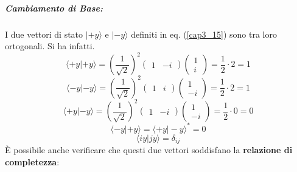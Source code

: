 \subparagraph{Cambiamento di Base:}
I due vettori di stato $| +y \rangle $ e $| -y \rangle$ definiti in eq. (\ref{cap3_15}) sono tra loro ortogonali. Si ha infatti.
	\begin{equation}
		\langle +y | +y \rangle=\left(\frac{1}{\sqrt{2}}\right)^2
		\begin{pmatrix}
		1 & -i
		\end{pmatrix}
		\begin{pmatrix}
		1 \\
		i
		\end{pmatrix}=
		\frac{1}{2}\cdot 2= 1
	\end{equation}
	\begin{equation}
		\langle -y | -y \rangle =\left(\frac{1}{\sqrt{2}}\right)^2
		\begin{pmatrix}
		1 & i
		\end{pmatrix}
		\begin{pmatrix}
1 \\
-i
\end{pmatrix}=
		\frac{1}{2}\cdot 2= 1
	\end{equation}
		\begin{equation}
		\langle +y | -y \rangle =\left(\frac{1}{\sqrt{2}}\right)^2
		\begin{pmatrix}
		1 & -i
		\end{pmatrix}
		\begin{pmatrix}
		1 \\
		-i
		\end{pmatrix}=
		\frac{1}{2}\cdot 0= 0
	\end{equation}
	\begin{equation}
		\langle -y | +y \rangle = \langle +y | -y \rangle ^*=0
	\end{equation}
	\begin{equation}
		\langle iy | jy \rangle = \delta_{ij}
	\end{equation}
È possibile anche verificare che questi due vettori soddisfano la \textbf{relazione di completezza}:
